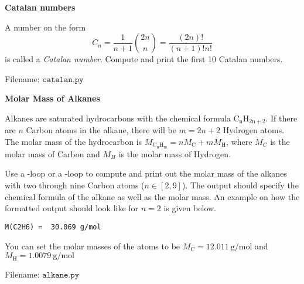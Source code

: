\begin{Problem}{\textbf{Catalan numbers}}

\noindent A number on the form
\begin{equation*}
    C_n=\frac{1}{n+1}\binom{2n}{n}=\frac{(2n)!}{(n+1)!n!}
\end{equation*}
is called a \emph{Catalan number}. Compute and print the first 10 Catalan numbers.
    
Filename: $\texttt{catalan.py}$
\end{Problem}

\begin{Problem}{\textbf{Molar Mass of Alkanes}}

\noindent
Alkanes are saturated hydrocarbons with the chemical formula $\mathrm{C_nH_{2n+2}}$. If there are $n$ Carbon atoms in the alkane, there will be $m = 2n+2$ Hydrogen atoms. The molar mass of the hydrocarbon is $M_{\mathrm{C_n H_{m}}} = n M_{\mathrm{C}} + m M_{\mathrm{H}} $, where $M_C$ is the molar mass of Carbon and $M_H$ is the molar mass of Hydrogen. 

Use a -loop or a -loop to compute and print out the molar mass of the alkanes with two through nine Carbon atoms ($n \in [2, 9]$). The output should specify the chemical formula of the alkane as well as the molar mass. An example on how the formatted output should look like for $n = 2$ is given below.
\begin{lstlisting}
M(C2H6) =  30.069 g/mol
\end{lstlisting}
You can set the molar masses of the atoms to be $M_{\mathrm{C}} = 12.011 \ \mathrm{g/mol}$ and $M_{\mathrm{H}}  = 1.0079 \ \mathrm{g/mol}$
    
Filename: $\texttt{alkane.py}$
\end{Problem}


